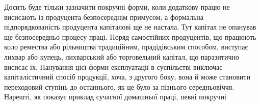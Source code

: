Досить буде тільки зазначити покручні форми, коли додаткову
працю не висисають із продуцента безпосереднім примусом,
а формальна підпорядкованість продуцента капіталові ще не настала.
Тут капітал не опанував ще безпосередньо процесу праці.
Поряд самостійних продуцентів, що працюють коло ремества
або рільництва традиційним, прадідівським способом, виступає
лихвар або купець, лихварський або торговельний капітал, що
паразитично висисає їх. Панування цієї форми експлуатації в
суспільстві виключає капіталістичний спосіб продукції, хоча,
з другого боку, вона й може становити переходовий ступінь до
останнього, як це було за пізнього середньовіччя. Нарешті, як
показує приклад сучасної домашньої праці, певні покручні
\parbreak{}  %
